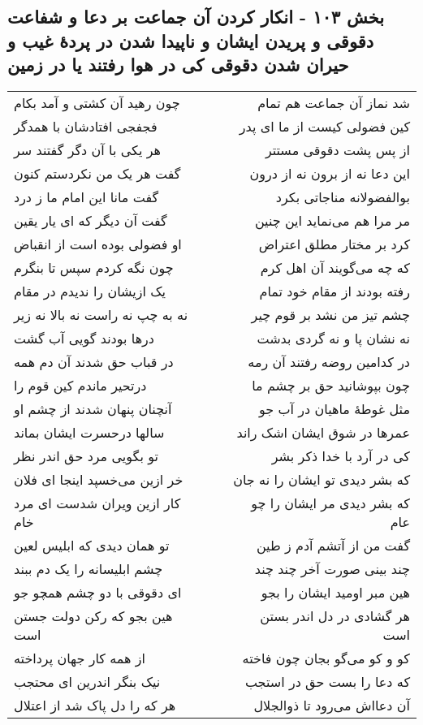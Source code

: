 \begin{center}
\section*{بخش ۱۰۳ - انکار کردن آن جماعت بر دعا و شفاعت دقوقی و پریدن ایشان و ناپیدا شدن در پردهٔ غیب و حیران شدن دقوقی کی در هوا رفتند یا در زمین}
\label{sec:sh103}
\begin{longtable}{l p{0.5cm} r}
چون رهید آن کشتی و آمد بکام
&&
شد نماز آن جماعت هم تمام
\\
فجفجی افتادشان با همدگر
&&
کین فضولی کیست از ما ای پدر
\\
هر یکی با آن دگر گفتند سر
&&
از پس پشت دقوقی مستتر
\\
گفت هر یک من نکردستم کنون
&&
این دعا نه از برون نه از درون
\\
گفت مانا این امام ما ز درد
&&
بوالفضولانه مناجاتی بکرد
\\
گفت آن دیگر که ای یار یقین
&&
مر مرا هم می‌نماید این چنین
\\
او فضولی بوده است از انقباض
&&
کرد بر مختار مطلق اعتراض
\\
چون نگه کردم سپس تا بنگرم
&&
که چه می‌گویند آن اهل کرم
\\
یک ازیشان را ندیدم در مقام
&&
رفته بودند از مقام خود تمام
\\
نه به چپ نه راست نه بالا نه زیر
&&
چشم تیز من نشد بر قوم چیر
\\
درها بودند گویی آب گشت
&&
نه نشان پا و نه گردی بدشت
\\
در قباب حق شدند آن دم همه
&&
در کدامین روضه رفتند آن رمه
\\
درتحیر ماندم کین قوم را
&&
چون بپوشانید حق بر چشم ما
\\
آنچنان پنهان شدند از چشم او
&&
مثل غوطهٔ ماهیان در آب جو
\\
سالها درحسرت ایشان بماند
&&
عمرها در شوق ایشان اشک راند
\\
تو بگویی مرد حق اندر نظر
&&
کی در آرد با خدا ذکر بشر
\\
خر ازین می‌خسپد اینجا ای فلان
&&
که بشر دیدی تو ایشان را نه جان
\\
کار ازین ویران شدست ای مرد خام
&&
که بشر دیدی مر ایشان را چو عام
\\
تو همان دیدی که ابلیس لعین
&&
گفت من از آتشم آدم ز طین
\\
چشم ابلیسانه را یک دم ببند
&&
چند بینی صورت آخر چند چند
\\
ای دقوقی با دو چشم همچو جو
&&
هین مبر اومید ایشان را بجو
\\
هین بجو که رکن دولت جستن است
&&
هر گشادی در دل اندر بستن است
\\
از همه کار جهان پرداخته
&&
کو و کو می‌گو بجان چون فاخته
\\
نیک بنگر اندرین ای محتجب
&&
که دعا را بست حق در استجب
\\
هر که را دل پاک شد از اعتلال
&&
آن دعااش می‌رود تا ذوالجلال
\\
\end{longtable}
\end{center}
